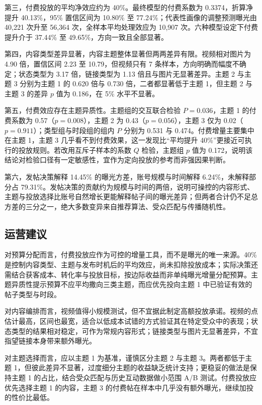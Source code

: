 第三，付费投放的平均净效应约为 40\%。最终模型的付费系数为 0.3374，折算净提升 40.13\%，95\% 置信区间为 10.80\% 至 77.24\%；代表性画像的调整预测曝光由 40,221 次升至 56,364 次，全样本平均处理效应为 10,907 次。六种模型设定下付费提升介于 37.44\% 至 49.65\%，方向一致且全部显著。

第四，内容类型差异显著，内容主题整体显著但两两差异有限。视频相对图片为 4.90 倍，置信区间 2.23 至 10.79，但视频只有 7 条样本，方向明确而幅度不确定；状态类型为 3.17 倍，链接类型为 1.13 倍且与图片无显著差异。主题 2 与主题 3 分别为主题 1 的 0.620 倍与 0.730 倍，二者都显著低于主题 1，但主题 2 与主题 3 的差异 $p$ 值为 0.186，在 5\% 水平不显著。

第五，付费效应存在主题异质性。主题组的交互联合检验 $P=0.036$，主题 1 的付费系数为 0.57（$p=0.008$），主题 2 为 0.43（$p=0.056$），主题 3 仅为 0.02（$p=0.911$）；类型组与时段组的组内 $P$ 分别为 0.531 与 0.474。付费增量主要集中在主题 1，主题 3 几乎看不到付费效果，这一发现比“平均提升 40\%”更接近可执行的投放规则。若改用互斥子样本的系数 $Q$ 检验，主题组 $p$ 值为 0.172，说明该结论对检验口径有一定敏感性，宜作为定向投放的参考而非强因果判断。

第六，发帖决策解释 14.45\% 的曝光方差，账号规模与时间解释 6.24\%，未解释部分占 79.31\%。发帖决策的贡献约为规模与时间的两倍，说明可操控的内容形式、主题与投放选择比账号自然增长更能解释帖子间的曝光差异；但两者合计仍不足总方差的三分之一，绝大多数变异来自推荐算法、受众匹配与传播随机性。

\subsection{运营建议}

对预算分配而言，付费投放应作为可控的增量工具，而不是曝光的唯一来源。40\% 是控制内容类型、主题与发布时机后的平均效应，尚未扣除投放成本；实际决策还需结合获客成本、转化率与投放目标，按边际收益而非单纯曝光增量分配预算。主题异质性提示预算不应平均撒向三类主题，而应优先投向主题 1 中已验证有效的帖子类型与时段。

对内容编排而言，视频值得小规模测试，但不宜据此制定高额投放承诺。视频的点估计最高，区间也最宽，适合以低成本试错的方式验证其在特定受众中的表现；状态类型的结果相对稳定，可作为常规内容形式；链接类型与图片无显著差异，不宜指望链接本身带来额外曝光。

对主题选择而言，应以主题 1 为基准，谨慎区分主题 2 与主题 3。两者都低于主题 1，但彼此差异不显著，过度细分主题的收益缺乏统计支持；更稳妥的做法是保持主题 1 的占比，结合受众匹配与历史互动数据做小范围 A/B 测试。付费投放应优先选择主题 1 的内容，主题 3 的付费帖在样本中几乎没有额外曝光，继续加投的性价比最低。

